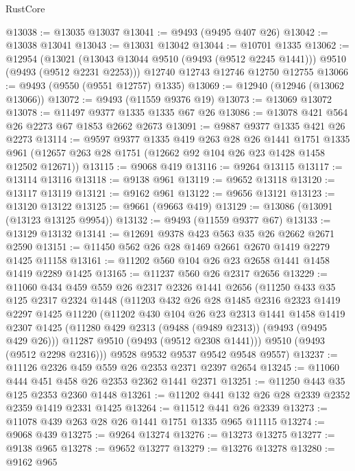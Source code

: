 \begin{lexlean}{RustCore}
\begin{coremodule}
@13038 := @13035 @13037
@13041 := @9493 (@9495 @407 @26)
@13042 := @13038 @13041
@13043 := @13031 @13042
@13044 := @10701 @1335
@13062 := @12954
    (@13021 (@13043 @13044 @9510 (@9493 (@9512 @2245 @1441))) @9510 (@9493 (@9512 @2231 @2253)))
    @12740
    @12743
    @12746
    @12750
    @12755
@13066 := @9493 (@9550 (@9551 @12757) @1335)
@13069 := @12940 (@12946 (@13062 @13066))
@13072 := @9493 (@11559 @9376 @19)
@13073 := @13069 @13072
@13078 := @11497 @9377 @1335 @1335 @67 @26
@13086 := @13078 @421 @564 @26 @2273 @67 @1853 @2662 @2673
@13091 := @9887 @9377 @1335 @421 @26 @2273
@13114 := @9597
    @9377
    @1335
    @419
    @263
    @28
    @26
    @1441
    @1751
    @1335
    @961
    (@12657 @263 @28 @1751 (@12662 @92 @104 @26 @23 @1428 @1458 @12502 @12671))
@13115 := @9068 @419
@13116 := @9264 @13115
@13117 := @13114 @13116
@13118 := @9138 @961
@13119 := @9652 @13118
@13120 := @13117 @13119
@13121 := @9162 @961
@13122 := @9656 @13121
@13123 := @13120 @13122
@13125 := @9661 (@9663 @419)
@13129 := @13086 (@13091 (@13123 @13125 @9954))
@13132 := @9493 (@11559 @9377 @67)
@13133 := @13129 @13132
@13141 := @12691 @9378 @423 @563 @35 @26 @2662 @2671 @2590
@13151 := @11450 @562 @26 @28 @1469 @2661 @2670 @1419 @2279 @1425 @11158
@13161 := @11202 @560 @104 @26 @23 @2658 @1441 @1458 @1419 @2289 @1425
@13165 := @11237 @560 @26 @2317 @2656
@13229 := @11060
    @434
    @459
    @559
    @26
    @2317
    @2326
    @1441
    @2656
    (@11250
      @433
      @35
      @125
      @2317
      @2324
      @1448
      (@11203
        @432
        @26
        @28
        @1485
        @2316
        @2323
        @1419
        @2297
        @1425
        @11220
        (@11202
          @430
          @104
          @26
          @23
          @2313
          @1441
          @1458
          @1419
          @2307
          @1425
          (@11280 @429 @2313 (@9488 (@9489 @2313)) (@9493 (@9495 @429 @26)))
          @11287
          @9510
          (@9493 (@9512 @2308 @1441)))
        @9510
        (@9493 (@9512 @2298 @2316)))
      @9528
      @9532
      @9537
      @9542
      @9548
      @9557)
@13237 := @11126 @2326 @459 @559 @26 @2353 @2371 @2397 @2654
@13245 := @11060 @444 @451 @458 @26 @2353 @2362 @1441 @2371
@13251 := @11250 @443 @35 @125 @2353 @2360 @1448
@13261 := @11202 @441 @132 @26 @28 @2339 @2352 @2359 @1419 @2331 @1425
@13264 := @11512 @441 @26 @2339
@13273 := @11078 @439 @263 @28 @26 @1441 @1751 @1335 @965 @11115
@13274 := @9068 @439
@13275 := @9264 @13274
@13276 := @13273 @13275
@13277 := @9138 @965
@13278 := @9652 @13277
@13279 := @13276 @13278
@13280 := @9162 @965

\end{coremodule}
\end{lexlean}
